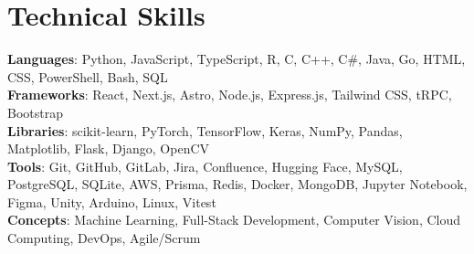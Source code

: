 \documentclass[letterpaper,11pt]{article}
\begin{document}
\section{Technical Skills}
 \begin{itemize}[leftmargin=0.15in, label={}]
    \small{\item{
     \textbf{Languages}{: Python, JavaScript, TypeScript, R, C, C++, C\#, Java, Go, HTML, CSS, PowerShell, Bash, SQL} \\
     \textbf{Frameworks}{: React, Next.js, Astro, Node.js, Express.js, Tailwind CSS, tRPC, Bootstrap} \\
     \textbf{Libraries}{: scikit-learn, PyTorch, TensorFlow, Keras, NumPy, Pandas, Matplotlib, Flask, Django, OpenCV} \\
     \textbf{Tools}{: Git, GitHub, GitLab, Jira, Confluence, Hugging Face, MySQL, PostgreSQL, SQLite, AWS, Prisma, Redis, Docker, MongoDB, Jupyter Notebook, Figma, Unity, Arduino, Linux, Vitest} \\
    \textbf{Concepts}{: Machine Learning, Full-Stack Development, Computer Vision,
    Cloud Computing, DevOps, Agile/Scrum} \\
    }}
 \end{itemize}

\end{document}
